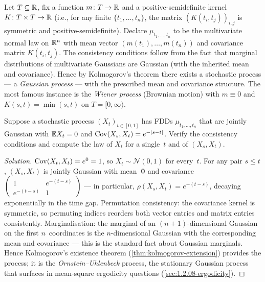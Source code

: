 \begin{example}
\label{ex:gaussian-process}
Let $T \subseteq \mathbb{R}$, fix a function $m \colon T \to \mathbb{R}$ and a
positive-semidefinite kernel $K \colon T \times T \to \mathbb{R}$ (i.e.,
for any finite $\{t_1, \dots, t_n\}$, the matrix
$(K(t_i, t_j))_{i, j}$ is symmetric and positive-semidefinite).
Declare $\mu_{t_1, \dots, t_n}$ to be the multivariate normal law
on $\mathbb{R}^n$ with mean vector $(m(t_1), \dots, m(t_n))$ and covariance
matrix $K(t_i, t_j)$. The consistency conditions follow from the
fact that marginal distributions of multivariate Gaussians are
Gaussian (with the inherited mean and covariance). Hence by
Kolmogorov's theorem there exists a stochastic process — a
\emph{Gaussian process} — with the prescribed mean and covariance
structure. The most famous instance is the \emph{Wiener process}
(Brownian motion) with $m \equiv 0$ and $K(s, t) = \min(s, t)$ on
$T = [0, \infty)$.
\end{example}

\begin{problem}
\label{prob:fdd-marginal}
Suppose a stochastic process $(X_t)_{t \in [0, 1]}$ has FDDs
$\mu_{t_1, \dots, t_n}$ that are jointly Gaussian with
$\mathbb{E} X_t = 0$ and $\operatorname{Cov}(X_s, X_t) = e^{-|s - t|}$. Verify the
consistency conditions and compute the law of $X_t$ for a single~$t$
and of $(X_s, X_t)$.
\end{problem}

\begin{proof}[Solution]
$\operatorname{Cov}(X_t, X_t) = e^{0} = 1$, so $X_t \sim \mathcal{N}(0, 1)$ for
every~$t$. For any pair $s \leq t$,
$(X_s, X_t)$ is jointly Gaussian with mean~$\mathbf{0}$ and
covariance $\begin{pmatrix} 1 & e^{-(t - s)} \\ e^{-(t - s)} & 1 \end{pmatrix}$ —
in particular, $\rho(X_s, X_t) = e^{-(t - s)}$, decaying
exponentially in the time gap. Permutation consistency: the
covariance kernel is symmetric, so permuting indices reorders both
vector entries and matrix entries consistently. Marginalisation:
the marginal of an $(n+1)$-dimensional Gaussian on the first
$n$~coordinates is the $n$-dimensional Gaussian with the
corresponding mean and covariance — this is the standard fact about
Gaussian marginals. Hence Kolmogorov's existence theorem
(\cref{thm:kolmogorov-extension}) provides the process; it is the
\emph{Ornstein–Uhlenbeck} process, the stationary Gaussian process
that surfaces in mean-square ergodicity questions
(\cref{sec:1.2.08-ergodicity}).
\end{proof}
